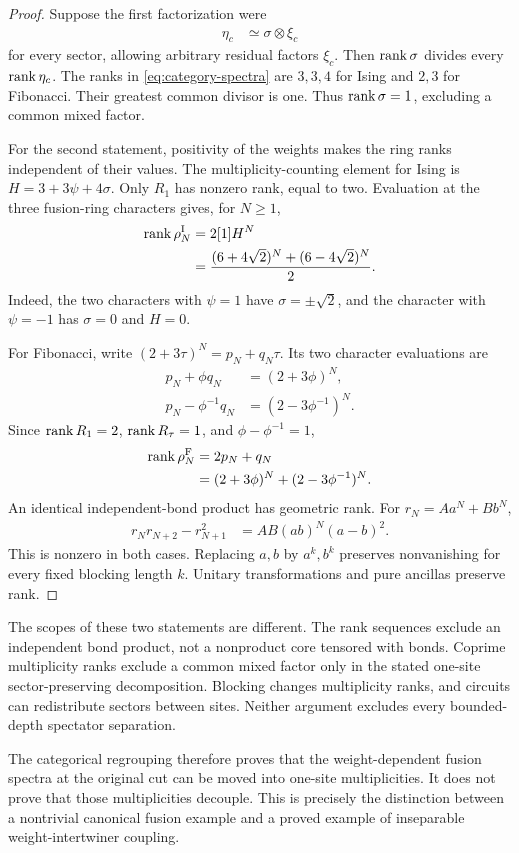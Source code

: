 \begin{proof}
	Suppose the first factorization were
	\begin{align}
		\eta_c & \simeq\sigma\otimes\xi_c
	\end{align}
	for every sector, allowing arbitrary residual factors $\xi_c$.
	Then $\operatorname{rank}\sigma$ divides every $\operatorname{rank}\eta_c$.
	The ranks in \cref{eq:category-spectra} are $3,3,4$ for Ising
	and $2,3$ for Fibonacci. Their greatest common divisor is one.
	Thus $\operatorname{rank}\sigma=1$, excluding a common mixed factor.

	For the second statement, positivity of the weights makes the ring
	ranks independent of their values. The multiplicity-counting element
	for Ising is $H=3+3\psi+4\sigma$. Only $R_1$ has nonzero rank,
	equal to two. Evaluation at the three fusion-ring characters gives,
	for $N\geq1$,
	\begin{align}
		\operatorname{rank}\rho_N^{\mathrm I}
		 & =2[1]H^N                                \\
		 & =\frac{(6+4\sqrt2)^N+(6-4\sqrt2)^N}{2}.
		\label{eq:Ising-rank}
	\end{align}
	Indeed, the two characters with $\psi=1$ have
	$\sigma=\pm\sqrt2$, and the character with $\psi=-1$ has
	$\sigma=0$ and $H=0$.

	For Fibonacci, write
	$(2+3\tau)^N=p_N+q_N\tau$. Its two character evaluations are
	\begin{align}
		p_N+\phi q_N     & =(2+3\phi)^N,      \\
		p_N-\phi^{-1}q_N & =(2-3\phi^{-1})^N.
	\end{align}
	Since $\operatorname{rank} R_1=2$, $\operatorname{rank} R_\tau=1$, and
	$\phi-\phi^{-1}=1$,
	\begin{align}
		\operatorname{rank}\rho_N^{\mathrm F}
		 & =2p_N+q_N                      \\
		 & =(2+3\phi)^N+(2-3\phi^{-1})^N.
		\label{eq:Fibonacci-rank}
	\end{align}
	An identical independent-bond product has geometric rank. For
	$r_N=Aa^N+Bb^N$,
	\begin{align}
		r_Nr_{N+2}-r_{N+1}^2
		 & =AB(ab)^N(a-b)^2.
	\end{align}
	This is nonzero in both cases. Replacing $a,b$ by $a^k,b^k$
	preserves nonvanishing for every fixed blocking length $k$.
	Unitary transformations and pure ancillas preserve rank.
\end{proof}

The scopes of these two statements are different. The rank sequences
exclude an independent bond product, not a nonproduct core tensored
with bonds. Coprime multiplicity ranks exclude a common mixed factor
only in the stated one-site sector-preserving decomposition. Blocking
changes multiplicity ranks, and circuits can redistribute sectors
between sites. Neither argument excludes every bounded-depth
spectator separation.

The categorical regrouping therefore proves that the weight-dependent
fusion spectra at the original cut can be moved into one-site
multiplicities. It does not prove that those multiplicities decouple.
This is precisely the distinction between a nontrivial canonical
fusion example and a proved example of inseparable
weight-intertwiner coupling.
